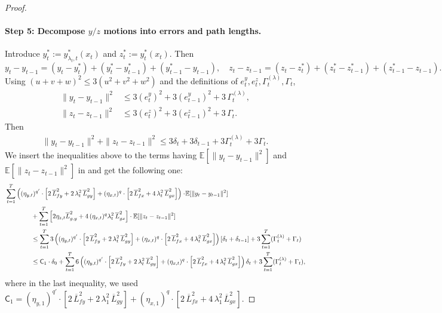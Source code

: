 \documentclass{uai2026} %
\begin{document}
\begin{proof}
\paragraph{Step 5: Decompose $y/z$ motions into errors and path lengths.}
Introduce $y_t^{*}:=y^{*}_{\lambda_t,t}(x_t)$ and $z_t^{*}:=y^{*}_t(x_t)$.
Then
\[
y_t-y_{t-1}=(y_t-y_t^{*})+(y_t^{*}-y_{t-1}^{*})+(y_{t-1}^{*}-y_{t-1}),
\quad
z_t-z_{t-1}=(z_t-z_t^{*})+(z_t^{*}-z_{t-1}^{*})+(z_{t-1}^{*}-z_{t-1}).
\]
Using $(u\!+\!v\!+\!w)^2\le 3(u^2\!+\!v^2\!+\!w^2)$ and the definitions of $e_t^y,e_t^z,\Gamma_t^{(\lambda)},\Gamma_t$,
\begin{align}
\|y_t-y_{t-1}\|^2 &\le 3(e_t^y)^2 + 3(e_{t-1}^y)^2 + 3\,\Gamma_t^{(\lambda)}, \label{eq:y-diff}\\
\|z_t-z_{t-1}\|^2 &\le 3(e_t^z)^2 + 3(e_{t-1}^z)^2 + 3\,\Gamma_t. \label{eq:z-diff}
\end{align}
Then
\begin{align}
    \|y_t-y_{t-1}\|^2+\|z_t-z_{t-1}\|^2\le 3\delta_{t}+3\delta_{t-1}+3\Gamma_{t}^{(\lambda)}+3\Gamma_{t}.
\end{align}
We insert the inequalities above to the terms having $\mathbb{E}[\|y_{t}-y_{t-1}\|^{2}]$ and $\mathbb{E}[\|z_{t}-z_{t-1}\|^{2}]$ in  and get the following one:
\begin{align}
    \MoveEqLeft[4] \sum_{t=1}^{T}\left((\eta_{y,t})^{q'}\cdot\left[2\,\overline L_{fy}^2+ 2\,\lambda_t^2\,\overline L_{gy}^2\right]+(\eta_{x,t})^{q}\cdot\left[2\,\overline L_{fx}^2+4\,\lambda_t^2\,\overline L_{gx}^2\right]\right)\cdot\!\mathbb{E}[\|y_t-y_{t-1}\|^2]\notag\\
&+ \sum_{t=1}^{T}\left[2\eta_{z,t}\overline L_{g,y}^2+4\,(\eta_{x,t})^{q}\lambda_t^2\,\overline L_{gx}^2\right]\cdot\mathbb{E}[\|z_t-z_{t-1}\|^2]\nonumber\\
&\le \sum_{t=1}^{T} 3\left((\eta_{y,t})^{q'}\cdot\left[2\,\overline L_{fy}^2+ 2\,\lambda_t^2\,\overline L_{gy}^2\right]+(\eta_{x,t})^{q}\cdot\left[2\,\overline L_{fx}^2+4\,\lambda_t^2\,\overline L_{gx}^2\right]\right)[\delta_{t}+\delta_{t-1}]+3\sum_{t=1}^{T}(\Gamma_{t}^{(\lambda)}+\Gamma_{t})\nonumber\\
&\le \mathsf{C}_{1}\cdot \delta_{0}+\sum_{t=1}^{T} 6\left((\eta_{y,t})^{q'}\cdot\left[2\,\overline L_{fy}^2+ 2\,\lambda_t^2\,\overline L_{gy}^2\right]+(\eta_{x,t})^{q}\cdot\left[2\,\overline L_{fx}^2+4\,\lambda_t^2\,\overline L_{gx}^2\right]\right)\delta_{t}+3\sum_{t=1}^{T}(\Gamma_{t}^{(\lambda)}+\Gamma_{t}),\label{eq_00101}
\end{align}
where in the last inequality, we used $\mathsf{C}_{1}=(\eta_{y,1})^{q'}\cdot\left[2\,\overline L_{fy}^2+ 2\,\lambda_1^2\,\overline L_{gy}^2\right]+(\eta_{x,1})^{q}\cdot\left[2\,\overline L_{fx}^2+4\,\lambda_1^2\,\overline L_{gx}^2\right]$.


\end{proof}
\end{document}
